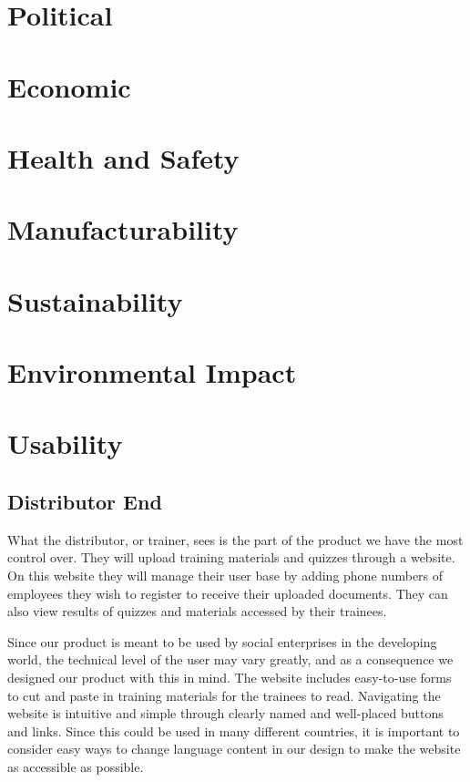 \section*{Political}

\section*{Economic}

\section*{Health and Safety}

\section*{Manufacturability}

\section*{Sustainability}

\section*{Environmental Impact}

\section*{Usability}
\subsection*{Distributor End}

What the distributor, or trainer, sees is the part of the product we have the most control over. They will upload training materials and quizzes through a website. On this website they will manage their user base by adding phone numbers of employees they wish to register to receive their uploaded documents. They can also view results of quizzes and materials accessed by their trainees. 

Since our product is meant to be used by social enterprises in the developing world, the technical level of the user may vary greatly, and as a consequence we designed our product with this in mind. The website includes easy-to-use forms to cut and paste in training materials for the trainees to read. Navigating the website is intuitive and simple through clearly named and well-placed buttons and links. Since this could be used in many different countries, it is important to consider easy ways to change language content in our design to make the website as accessible as possible.

